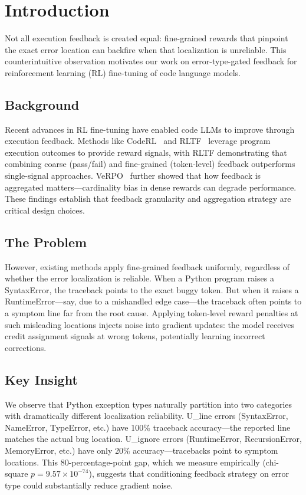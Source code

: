 \section{Introduction}

Not all execution feedback is created equal: fine-grained rewards that pinpoint the exact error location can backfire when that localization is unreliable. This counterintuitive observation motivates our work on error-type-gated feedback for reinforcement learning (RL) fine-tuning of code language models.

\subsection{Background}

Recent advances in RL fine-tuning have enabled code LLMs to improve through execution feedback. Methods like CodeRL~\cite{le2022coderl} and RLTF~\cite{liu2023rltf} leverage program execution outcomes to provide reward signals, with RLTF demonstrating that combining coarse (pass/fail) and fine-grained (token-level) feedback outperforms single-signal approaches. VeRPO~\cite{wang2026verpo} further showed that how feedback is aggregated matters---cardinality bias in dense rewards can degrade performance. These findings establish that feedback granularity and aggregation strategy are critical design choices.

\subsection{The Problem}

However, existing methods apply fine-grained feedback uniformly, regardless of whether the error localization is reliable. When a Python program raises a SyntaxError, the traceback points to the exact buggy token. But when it raises a RuntimeError---say, due to a mishandled edge case---the traceback often points to a symptom line far from the root cause. Applying token-level reward penalties at such misleading locations injects noise into gradient updates: the model receives credit assignment signals at wrong tokens, potentially learning incorrect corrections.

\subsection{Key Insight}

We observe that Python exception types naturally partition into two categories with dramatically different localization reliability. U\_line errors (SyntaxError, NameError, TypeError, etc.) have 100\% traceback accuracy---the reported line matches the actual bug location. U\_ignore errors (RuntimeError, RecursionError, MemoryError, etc.) have only 20\% accuracy---tracebacks point to symptom locations. This 80-percentage-point gap, which we measure empirically (chi-square $p=9.57\times10^{-74}$), suggests that conditioning feedback strategy on error type could substantially reduce gradient noise.

